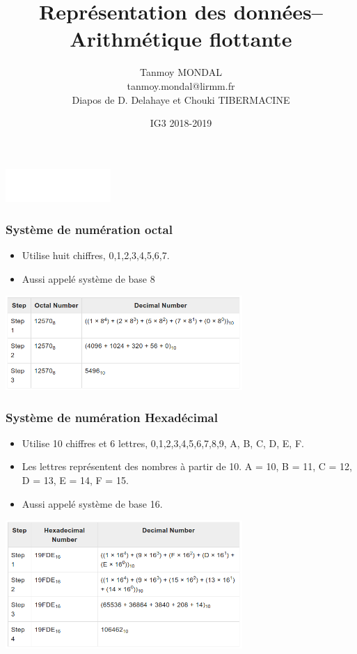 \documentclass{beamer}
\title[Arithmétique flottante]{Représentation des données\break{}-- Arithmétique
flottante}
\author[T.~Mondal]{\large{Tanmoy MONDAL}\\
	\vspace{1cm}
	\small{tanmoy.mondal@lirmm.fr}\\
	Diapos de D. Delahaye et Chouki TIBERMACINE}
\institute{Polytech Montpellier}
\date{\tiny{IG3 2018-2019}}
\begin{document}
\begin{frame}
\titlepage
\begin{center}
\includegraphics[width=4cm]{figs/polytech.png}
\end{center}
\end{frame}


\begin{frame}
	\frametitle{Système de numération octal}
	
	\begin{itemize}
		\item Utilise huit chiffres, 0,1,2,3,4,5,6,7.
		\item Aussi appelé système de base 8
	\end{itemize}
	\begin{center}
		\includegraphics[width=9cm]{figs/octal.png}
	\end{center}
	\normalsize
\end{frame}

\begin{frame}
	\frametitle{Système de numération Hexadécimal}
	
	\begin{itemize}
		\item Utilise 10 chiffres et 6 lettres, 0,1,2,3,4,5,6,7,8,9, A, B, C, D, E, F.
		\item Les lettres représentent des nombres à partir de 10. A = 10, B = 11, C = 12, D = 13, E = 14, F = 15.
		\item Aussi appelé système de base 16.
	\end{itemize}
	\begin{center}
		\includegraphics[width=9cm]{figs/hexaDecimal.png}
	\end{center}
	\normalsize
\end{frame}
\end{document}
